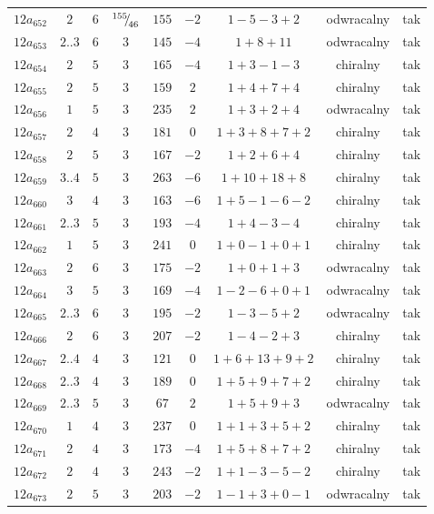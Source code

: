 \begin{longtable}{ccccccccc}
$12a_{652}$ & $2$ & $6$ & ${}^{155}{\mskip -5mu/\mskip -3mu}_{46}$ & $155$ & $-2$ & $1-5-3+2$ & odwracalny & tak \\
$12a_{653}$ & $2..3$ & $6$ & $3$ & $145$ & $-4$ & $1+8+11$ & odwracalny & tak \\
$12a_{654}$ & $2$ & $5$ & $3$ & $165$ & $-4$ & $1+3-1-3$ & chiralny & tak \\
$12a_{655}$ & $2$ & $5$ & $3$ & $159$ & $2$ & $1+4+7+4$ & chiralny & tak \\
$12a_{656}$ & $1$ & $5$ & $3$ & $235$ & $2$ & $1+3+2+4$ & odwracalny & tak \\
$12a_{657}$ & $2$ & $4$ & $3$ & $181$ & $0$ & $1+3+8+7+2$ & chiralny & tak \\
$12a_{658}$ & $2$ & $5$ & $3$ & $167$ & $-2$ & $1+2+6+4$ & chiralny & tak \\
$12a_{659}$ & $3..4$ & $5$ & $3$ & $263$ & $-6$ & $1+10+18+8$ & chiralny & tak \\
$12a_{660}$ & $3$ & $4$ & $3$ & $163$ & $-6$ & $1+5-1-6-2$ & chiralny & tak \\
$12a_{661}$ & $2..3$ & $5$ & $3$ & $193$ & $-4$ & $1+4-3-4$ & chiralny & tak \\
$12a_{662}$ & $1$ & $5$ & $3$ & $241$ & $0$ & $1+0-1+0+1$ & chiralny & tak \\
$12a_{663}$ & $2$ & $6$ & $3$ & $175$ & $-2$ & $1+0+1+3$ & odwracalny & tak \\
$12a_{664}$ & $3$ & $5$ & $3$ & $169$ & $-4$ & $1-2-6+0+1$ & odwracalny & tak \\
$12a_{665}$ & $2..3$ & $6$ & $3$ & $195$ & $-2$ & $1-3-5+2$ & odwracalny & tak \\
$12a_{666}$ & $2$ & $6$ & $3$ & $207$ & $-2$ & $1-4-2+3$ & chiralny & tak \\
$12a_{667}$ & $2..4$ & $4$ & $3$ & $121$ & $0$ & $1+6+13+9+2$ & chiralny & tak \\
$12a_{668}$ & $2..3$ & $4$ & $3$ & $189$ & $0$ & $1+5+9+7+2$ & chiralny & tak \\
$12a_{669}$ & $2..3$ & $5$ & $3$ & $67$ & $2$ & $1+5+9+3$ & odwracalny & tak \\
$12a_{670}$ & $1$ & $4$ & $3$ & $237$ & $0$ & $1+1+3+5+2$ & chiralny & tak \\
$12a_{671}$ & $2$ & $4$ & $3$ & $173$ & $-4$ & $1+5+8+7+2$ & chiralny & tak \\
$12a_{672}$ & $2$ & $4$ & $3$ & $243$ & $-2$ & $1+1-3-5-2$ & chiralny & tak \\
$12a_{673}$ & $2$ & $5$ & $3$ & $203$ & $-2$ & $1-1+3+0-1$ & odwracalny & tak \\

\end{longtable}
